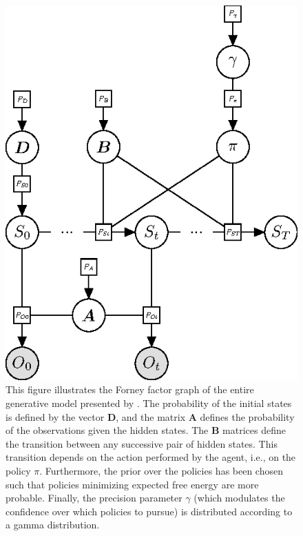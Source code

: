\documentclass[twoside,11pt]{article}
\begin{document}
\begin{figure}[H]
	\begin{center}
	\includegraphics[scale=0.9]{BTAI-figure2}
	\end{center}
    \caption{This figure illustrates the Forney factor graph of the entire generative model presented by \citet{FRISTON2016862}. The probability of the initial states is defined by the vector $\bm{D}$, and the matrix $\bm{A}$ defines the probability of the observations given the hidden states. The $\bm{B}$ matrices define the transition between any successive pair of hidden states. This transition depends on the action performed by the agent, i.e., on the policy $\pi$. Furthermore, the prior over the policies has been chosen such that policies minimizing expected free energy are more probable. Finally, the precision parameter $\gamma$ (which modulates the confidence over which policies to pursue) is distributed according to a gamma distribution.}
    \label{fig:full_GM}
\end{figure}
\end{document}
